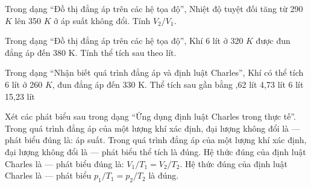 \begin{bt}
Trong dạng “Đồ thị đẳng áp trên các hệ tọa độ”, Nhiệt độ tuyệt đối tăng từ 290 $K$ lên 350 $K$ ở áp suất không đổi. Tính $V_2/V_1$.
\end{bt}

\begin{ex}
Trong dạng “Đồ thị đẳng áp trên các hệ tọa độ”, Khí 6 lít ở 320 $K$ được đun đẳng áp đến 380 K. Tính thể tích sau theo lít.
\end{ex}

\begin{ex}
Trong dạng “Nhận biết quá trình đẳng áp và định luật Charles”, Khí có thể tích 6 lít ở 260 $K$, đun đẳng áp đến 330 K. Thể tích sau gần bằng
\choice
{,62 lít}
{4,73 lít}
{6 lít}
{15,23 lít}
\end{ex}

\begin{ex}
Xét các phát biểu sau trong dạng “Ứng dụng định luật Charles trong thực tế”.
\choiceTF
{\True Trong quá trình đẳng áp của một lượng khí xác định, đại lượng không đổi là — phát biểu đúng là: áp suất.}
{Trong quá trình đẳng áp của một lượng khí xác định, đại lượng không đổi là — phát biểu thể tích là đúng.}
{\True Hệ thức đúng của định luật Charles là — phát biểu đúng là: $V_1/T_1=V_2/T_2$.}
{Hệ thức đúng của định luật Charles là — phát biểu $p_1/T_1=p_2/T_2$ là đúng.}
\end{ex}

